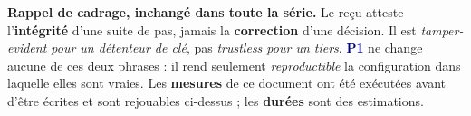 \documentclass[10pt]{article}
\newcommand{\mm}[1]{\textbf{\textcolor{navy}{#1}}}
\begin{document}
\begin{these}
\small\textbf{Rappel de cadrage, inchangé dans toute la série.} Le reçu atteste l'\textbf{intégrité}
d'une suite de pas, jamais la \textbf{correction} d'une décision. Il est \emph{tamper-evident pour
un détenteur de clé}, pas \emph{trustless pour un tiers}. \mm{P1} ne change aucune de ces deux
phrases : il rend seulement \emph{reproductible} la configuration dans laquelle elles sont vraies.
Les \textbf{mesures} de ce document ont été exécutées avant d'être écrites et sont rejouables
ci-dessus ; les \textbf{durées} sont des estimations.
\end{these}
\end{document}
